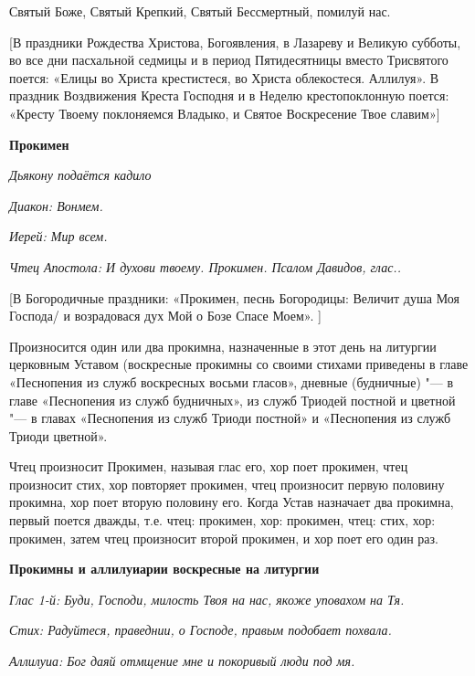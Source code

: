 Святый Боже, Святый Крепкий, Святый Бессмертный, помилуй нас.


[В праздники Рождества Христова, Богоявления, в Лазареву и Великую субботы, во все дни пасхальной седмицы и в период Пятидесятницы вместо Трисвятого поется: «Елицы во Христа крестистеся, во Христа облекостеся. Аллилуя». В праздник Воздвижения Креста Господня и в Неделю крестопоклонную поется: «Кресту Твоему поклоняемся Владыко, и Святое Воскресение Твое славим»]




\medskip


\bfseries Прокимен \normalfont{}


\itshape Дьякону подаётся кадило\normalfont{}


\itshape Диакон:\normalfont{} Вонмем.


\itshape Иерей:\normalfont{} Мир всем.


\itshape Чтец Апостола:\normalfont{} И духови твоему. Прокимен. Псалом Давидов, глас..




[В Богородичные праздники: «Прокимен, песнь Богородицы: Величит душа Моя Господа/ и возрадовася дух Мой о Бозе Спасе Моем». ]


Произносится один или два прокимна, назначенные в этот день на литургии церковным Уставом (воскресные прокимны со своими стихами приведены в главе «Песнопения из служб воскресных восьми гласов», дневные (будничные) "--- в главе «Песнопения из служб будничных», из служб Триодей постной и цветной "--- в главах «Песнопения из служб Триоди постной» и «Песнопения из служб Триоди цветной».


Чтец произносит Прокимен, называя глас его, хор поет прокимен, чтец произносит стих, хор повторяет прокимен, чтец произносит первую половину прокимна, хор поет вторую половину его. Когда Устав назначает два прокимна, первый поется дважды, т.е. чтец: прокимен, хор: прокимен, чтец: стих, хор: прокимен, затем чтец произносит второй прокимен, и хор поет его один раз.


\medskip
\bfseries Прокимны и аллилуиарии воскресные на литургии\normalfont{}


\itshape Глас 1-й:\normalfont{} Буди, Господи, милость Твоя на нас, якоже уповахом на Тя.


\itshape Стих:\normalfont{} Радуйтеся, праведнии, о Господе, правым подобает похвала.


\itshape Аллилуиа:\normalfont{} Бог даяй отмщение мне и покоривый люди под мя.



